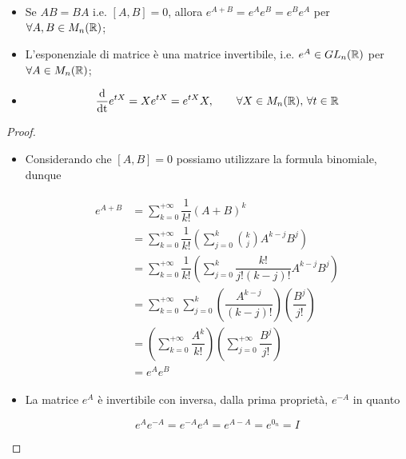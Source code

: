 \begin{itemize}
	\item Se $ A B = B A $ i.e. $ [A,B] = 0 $, allora $ e^{A + B} = e^{A} e^{B} = e^{B} e^{A} $ per $ \forall A,B \in M_{n}(\mathbb{R}) $;
	
	\item L'esponenziale di matrice è una matrice invertibile, i.e. $ e^{A} \in GL_{n}(\mathbb{R}) $ per $ \forall A \in M_{n}(\mathbb{R}) $;
	
	\item %
	\begin{equation}
		\dfrac{\operatorname{d}}{\operatorname{dt}} e^{t X} = X e^{t X} = e^{t X} X, \qquad \forall X\in M_{n}(\mathbb{R}), \, \forall t \in \mathbb{R}
	\end{equation}
\end{itemize}

\begin{proof}
	\begin{itemize}
		\item Considerando che $ [A,B] = 0 $ possiamo utilizzare la formula binomiale, dunque
		
		\begin{align}
			\begin{split}
				e^{A + B} &= \sum_{k=0}^{+\infty} \dfrac{1}{k!} (A+B)^{k}\\
				&= \sum_{k=0}^{+\infty} \dfrac{1}{k!} \left( \sum_{j=0}^{k} \binom{k}{j} A^{k-j} B^{j} \right)\\
				&= \sum_{k=0}^{+\infty} \dfrac{1}{k!} \left( \sum_{j=0}^{k} \dfrac{k!}{j! (k-j)!} A^{k-j} B^{j} \right)\\
				&= \sum_{k=0}^{+\infty} \sum_{j=0}^{k} \left( \dfrac{A^{k-j}}{(k-j)!} \right) \left( \dfrac{B^{j}}{j!} \right)\\
				&= \left( \sum_{k=0}^{+\infty} \dfrac{A^{k}}{k!} \right) \left( \sum_{j=0}^{+\infty} \dfrac{B^{j}}{j!} \right)\\
				&= e^{A} e^{B}
			\end{split}
		\end{align}
		
		\item La matrice $ e^{A} $ è invertibile con inversa, dalla prima proprietà, $ e^{-A} $ in quanto
		
		\begin{equation}
			e^{A} e^{-A} = e^{-A} e^{A} = e^{A-A} = e^{0_{n}} = I
		\end{equation}
	

\end{itemize}
\end{proof}
